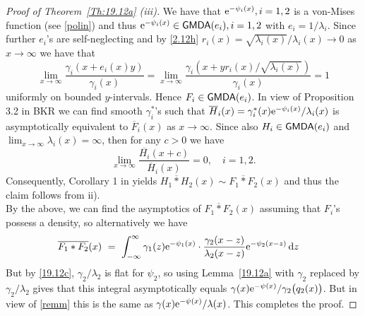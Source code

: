 \begin{subappendices}
\begin{proof}[Proof of Theorem~{\ref{Th:19.12a}} {\rm (iii)}]
We have that $\mathrm{e}^{- \psi_i(x)},i=1,2$ is a von-Mises function (see \eqref{polin}) and thus  $\mathrm{e}^{- \psi_i(x)} \in \mathsf{GMDA}(e_i),i=1,2$ with $e_i=1/\lambda_i$. Since further $e_i$'s are self-neglecting and by \eqref{2.12h} $r_i(x)= \sqrt{\lambda_i(x)}/\lambda_i(x) \to 0$
as $x\to \infty$ we have that %
$$ \lim_{x\to \infty}\frac{\gamma_i(x+ e_i(x)y )}{\gamma_i(x)}=
\lim_{x\to \infty}\frac{\gamma_i(x+ yr_i(x)/ \sqrt{\lambda_i(x)} )}{\gamma_i(x)} =1$$
uniformly on bounded $y$-intervals. Hence  $F_i \in \mathsf{GMDA}(e_i)$. In view of Proposition 3.2 in BKR we can find smooth $\gamma_i^*$'s such that $\overline{H}_i(x)= \gamma_i^*(x)\mathrm{e}^{- \psi_i(x)}/\lambda_i(x)$ is asymptotically equivalent to $\overline{F}_i(x)$ as $x\to \infty$. Since also $H_i\in \mathsf{GMDA}(e_i)$ and $\lim_{x\to \infty} \lambda_i(x)= \infty$, then for any $c>0$ we have
$$ \lim_{x\to \infty} \frac{\overline{H_i}(x+ c)}{\overline H_i(x)}=
0, \quad i=1,2.$$
Consequently, Corollary 1 in \cite{embrechts2014aggregation} yields $\overline{H_1*H_2}(x) \sim
\overline{F_1*F_2}(x)$ and thus the claim follows from ii).\\ 	
By the above, we can find the asymptotics of $\overline{F_1*F_2}(x)$ assuming that $F_i$'s possess a density, so alternatively we have
\begin{align}\overline{F_1*F_2}(x)\ &=\ \int_{-\infty}^\infty \gamma_1(z)\mathrm{e}^{-\psi_1(x)}\cdot\frac{\gamma_2(x-z)}
{\lambda_2(x-z)} \mathrm{e}^{-\psi_2(x-z)}\,\mathrm{d} z
\end{align}
But by \eqref{19.12c}, $\gamma_2/\lambda_2$ is flat for $\psi_2$, so using Lemma~\ref{19.12a}
with $\gamma_2$ replaced by $\gamma_2/\lambda_2$ gives that
this integral asymptotically equals $\gamma(x)\mathrm{e}^{-\psi(x)}/\gamma_2\bigl(q_2(x)\bigr)$.
But in view of \eqref{remm} this is the same as $\gamma(x)\mathrm{e}^{-\psi(x)}/\lambda(x)$. 
This completes the proof.
\end{proof}

\end{subappendices}
